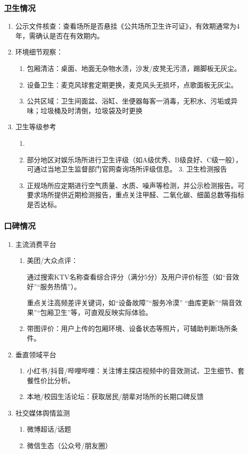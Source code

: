 \subsubsection{卫生情况}
\begin{enumerate}
  \item 公示文件核查：查看场所是否悬挂《公共场所卫生许可证》，有效期通常为4年，需确认是否在有效期内。
  \item 环境细节观察：
         \begin{enumerate}
          \item 包厢清洁：桌面、地面无杂物水渍，沙发/皮凳无污渍，踢脚板无灰尘。
          \item 设备卫生：麦克风球套定期更换，麦克风头无损坏，点歌面板无灰尘。
          \item 公共区域：卫生间面盆、浴缸、坐便器每客一消毒，无积水、污垢或异味；垃圾桶及时清倒，垃圾袋及时更换
         \end{enumerate}
  \item 卫生等级参考
        \begin{enumerate}
          \item \item 部分地区对娱乐场所进行卫生评级（如A级优秀、B级良好、C级一般），可通过当地卫生监督部门官网查询场所评级信息。  3. 卫生检测报告
         \item 正规场所应定期进行空气质量、水质、噪声等检测，并公示检测报告。可要求场所提供近期检测报告，重点关注甲醛、二氧化碳、细菌总数等指标是否达标。
        \end{enumerate}
\end{enumerate}
\subsubsection{口碑情况}
\begin{enumerate}
  \item 主流消费平台
  \begin{enumerate}
    \item 美团/大众点评：

    通过搜索KTV名称查看综合评分（满分5分）及用户评价标签（如“音效好”“服务热情”）。

    重点关注高频差评关键词，如“设备故障”“服务冷漠” “曲库更新”“隔音效果”“包厢卫生”等，可直观反映实际体验。
    \item 带图评价：用户上传的包厢环境、设备状态等照片，可辅助判断场所条件。
  \end{enumerate}

  \item 垂直领域平台
        \begin{enumerate}
          \item 小红书/抖音/哔哩哔哩：关注博主探店视频中的音效测试、卫生细节、套餐性价比分析。
          \item 本地/校园生活论坛：获取居民/朋辈对场所的长期口碑反馈
        \end{enumerate}
  \item 社交媒体舆情监测
  \begin{enumerate}
    \item 微博超话/话题
    \item 微信生态（公众号/朋友圈）
  \end{enumerate}
\end{enumerate}

